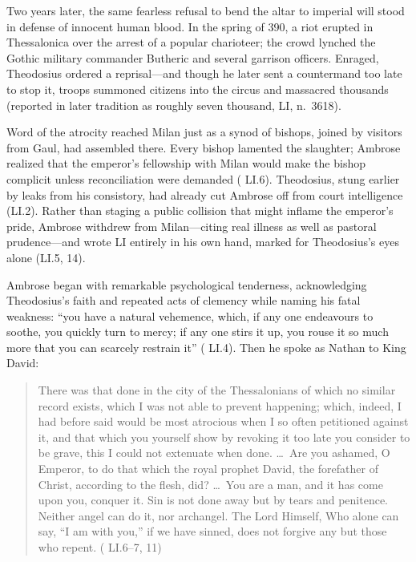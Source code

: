 Two years later, the same fearless refusal to bend the altar to imperial will stood in defense of innocent human blood. In the spring of 390, a riot erupted in Thessalonica over the arrest of a popular charioteer; the crowd lynched the Gothic military commander Butheric and several garrison officers. Enraged, Theodosius ordered a reprisal---and though he later sent a countermand too late to stop it, troops summoned citizens into the circus and massacred thousands (reported in later tradition as roughly seven thousand,  LI, n.~3618).

Word of the atrocity reached Milan just as a synod of bishops, joined by visitors from Gaul, had assembled there. Every bishop lamented the slaughter; Ambrose realized that the emperor's fellowship with Milan would make the bishop complicit unless reconciliation were demanded ( LI.6). Theodosius, stung earlier by leaks from his consistory, had already cut Ambrose off from court intelligence (LI.2). Rather than staging a public collision that might inflame the emperor's pride, Ambrose withdrew from Milan---citing real illness as well as pastoral prudence---and wrote  LI entirely in his own hand, marked for Theodosius's eyes alone (LI.5, 14).

Ambrose began with remarkable psychological tenderness, acknowledging Theodosius's faith and repeated acts of clemency while naming his fatal weakness: ``you have a natural vehemence, which, if any one endeavours to soothe, you quickly turn to mercy; if any one stirs it up, you rouse it so much more that you can scarcely restrain it'' ( LI.4). Then he spoke as Nathan to King David:

\begin{quote}
There was that done in the city of the Thessalonians of which no similar record exists, which I was not able to prevent happening; which, indeed, I had before said would be most atrocious when I so often petitioned against it, and that which you yourself show by revoking it too late you consider to be grave, this I could not extenuate when done. \ldots\ Are you ashamed, O Emperor, to do that which the royal prophet David, the forefather of Christ, according to the flesh, did? \ldots\ You are a man, and it has come upon you, conquer it. Sin is not done away but by tears and penitence. Neither angel can do it, nor archangel. The Lord Himself, Who alone can say, ``I am with you,'' if we have sinned, does not forgive any but those who repent. ( LI.6--7, 11)
\end{quote}

